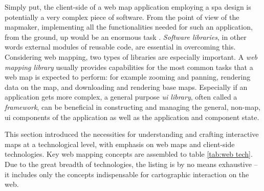 Simply put, the client-side of a
web map application employing a \acrshort{spa} design
is potentially a very complex piece of software.
From the point of view of the mapmaker,
implementing all the functionalities needed for such an application,
from the ground, up would be an enormous task \parencite{tai2021}.
\textit{Software libraries},
in other words external modules of reusable code,
are essential in overcoming this.
Considering web mapping, two types of libraries are especially important.
A \textit{web mapping library} usually provides capabilities for the most common tasks
that a web map is expected to perform:
for example zooming and panning, rendering data on the map,
and downloading and rendering base maps.
Especially if an application gets more complex,
a general purpose \textit{\acrshort{ui} library},
often called a \textit{framework},
can be beneficial in constructing and managing
the general, non-map, \acrshort{ui} components of the application
as well as the application and component state.

This section introduced the necessities for
understanding and crafting interactive maps at a technological level,
with emphasis on web maps and client-side technologies.
Key web mapping concepts are assembled to table \ref{tab:web tech}.
Due to the great breadth of technologies,
the listing is by no means exhaustive --
it includes only the concepts indispensable for cartographic interaction on the web.
 





